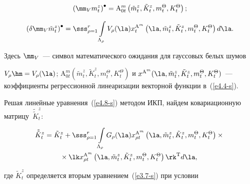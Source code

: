 \begin{equation}

\left(\mm_V m_t^z\right)^\bullet = \mathrm{A}_{0t}^m \left(\tilde m_t^z,\tilde K_t^z, 

m_t^\Theta, K_t^\Theta\right);

\label{e4.7-s}

\end{equation}

\begin{equation}

\left(\delta \mm_V \tilde m_t^z\right)^\bullet = \sss_{\rho=1}^r \int\limits_{\Lambda_\rho} 

V_\rho (\la) x_t^{\mathrm{A}^m} \left(\la,\tilde m_t^z,\tilde K_t^z, m_t^\Theta, 

K_t^\Theta\right)d\la.

\label{e4.8-s}

\end{equation}

Здесь  $\mm_V$~--- символ математического ожидания для гауссовых белых шумов 

$V_\rho \hm= V_\rho (\la)$; $\mathrm{A}_{0t}^m (\tilde m_t^z,\tilde K_t^z, m_t^\Theta, 

K_t^\Theta)$ и $x^{\mathrm{A}^m} (\la,\tilde m_t^z,\tilde K_t^z, m_t^\Theta, 

K_t^\Theta)$~--- коэффициенты регрессионной линеаризации векторной функции в~(\ref{e4.4-s}). 

Решая линейные уравнения~(\ref{e4.8-s}) методом ИКП, найдем ковариационную матрицу~$\tilde{\tilde K}_t^z$:

\begin{multline}

\tilde{\tilde K}_t^z =\tilde K_t^z +\sss_{\rho=1}^r \int\limits_{\Lambda_\rho} 

G_\rho (\la) x_{\rho t}^{\mathrm{A}^m} \left(\la,\tilde m_t^z,\tilde K_t^z, m_t^\Theta, 

K_t^\Theta\right)\times{}\\

{}\times \lk x_{\rho t}^{\mathrm{A}^m} \left(\la,\tilde m_t^z,\tilde K_t^z, 

m_t^\Theta, K_t^\Theta\right)\rk^{\mathrm{T}} d\la,\

\label{e4.9-s}

\end{multline}

где $\tilde K_t^z$ определяется вторым уравнением~(\ref{e3.7-s}) при условии 

